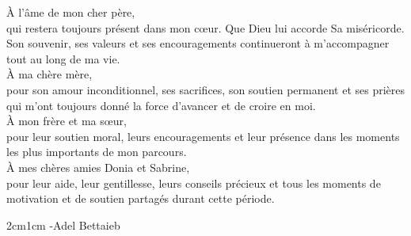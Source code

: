 
\begin{fquote}

\begin{center}

\large{
\uppercase{À} \large{l’âme de mon cher père,} \\[5pt]
qui restera toujours présent dans mon cœur. Que Dieu lui accorde Sa miséricorde. Son souvenir, ses valeurs et ses encouragements continueront à m’accompagner tout au long de ma vie.\\[12pt] 

\uppercase{À} \large{ma chère mère,} \\[5pt]
pour son amour inconditionnel, ses sacrifices, son soutien permanent et ses prières qui m’ont toujours donné la force d’avancer et de croire en moi.\\[12pt]



\uppercase{À} \large{mon frère et ma sœur,} \\[5pt]
pour leur soutien moral, leurs encouragements et leur présence dans les moments les plus importants de mon parcours.\\[12pt]

\uppercase{À} \large{mes chères amies Donia et Sabrine,} \\[5pt]
pour leur aide, leur gentillesse, leurs conseils précieux et tous les moments de motivation et de soutien partagés durant cette période.\\[12pt]


}

\end{center}

\bigskip
\medskip

\end{fquote}

\begin{adjustwidth}{2cm}{1cm}
\hspace*{\fill} \large{-Adel Bettaieb}
\end{adjustwidth}